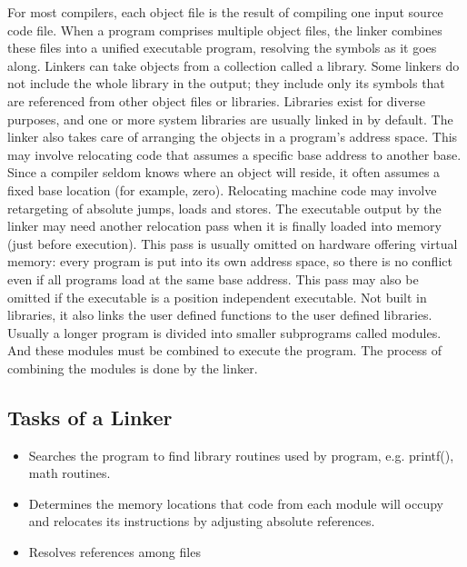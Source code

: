 \documentclass[a4paper,12pt]{extarticle}
\begin{document}
	For most compilers, each object file is the result of compiling one input source code
	file. When a program comprises multiple object files, the linker combines these files
	into a unified executable program, resolving the symbols as it goes along.
	Linkers can take objects from a collection called a library. Some linkers do not
	include the whole library in the output; they include only its symbols that are referenced
	from other object files or libraries. Libraries exist for diverse purposes, and
	one or more system libraries are usually linked in by default.
	The linker also takes care of arranging the objects in a program’s address space.
	This may involve relocating code that assumes a specific base address to another
	base. Since a compiler seldom knows where an object will reside, it often assumes
	a fixed base location (for example, zero). Relocating machine code may involve retargeting
	of absolute jumps, loads and stores.
	The executable output by the linker may need another relocation pass when it is
	finally loaded into memory (just before execution). This pass is usually omitted on
	hardware offering virtual memory: every program is put into its own address space,
	so there is no conflict even if all programs load at the same base address. This pass
	may also be omitted if the executable is a position independent executable.
	Not built in libraries, it also links the user defined functions to the user defined
	libraries. Usually a longer program is divided into smaller subprograms called modules.
	And these modules must be combined to execute the program. The process of
	combining the modules is done by the linker.
	\subsection{Tasks of a Linker}
	\begin{itemize}
		\item Searches the program to find library routines used by program, e.g. printf(),
		math routines.
		\item Determines the memory locations that code from each module will occupy and
		relocates its instructions by adjusting absolute references.
		\item Resolves references among files
	\end{itemize}
\end{document}
